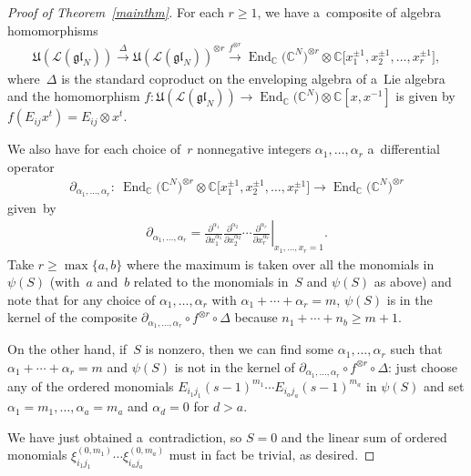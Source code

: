 \documentclass[pdftex]{sigma}
\numberwithin{theorem}{section}
\numberwithin{proposition}{section}
\numberwithin{lemma}{section}
\numberwithin{corollary}{section}
\numberwithin{definition}{section}
\numberwithin{example}{section}
\numberwithin{remark}{section}
\numberwithin{note}{section}
\DeclareMathOperator{\End}{End}
\numberwithin{equation}{section}
\begin{document}
\begin{proof}[Proof of Theorem~\ref{mainthm}]
For each $r \geq 1$, we have a~composite of algebra homomorphisms
\begin{gather*}
\mathfrak{U}(\mathcal{L}(\mathfrak{gl}_N)) \stackrel{\Delta}{\to}
\mathfrak{U}(\mathcal{L}(\mathfrak{gl}_N))^{\otimes r} \stackrel{f^{\otimes r}}{\rightarrow}
\End_{\mathbb{C}}\big(\mathbb{C}^N\big)^{\otimes r} \otimes \mathbb{C}\big[x_1^{\pm 1},x_2^{\pm 1},\ldots,x_r^{\pm 1}\big],
\end{gather*}
where~$\Delta$ is the standard coproduct on the enveloping algebra of a~Lie algebra and the homomorphism $f\colon
\mathfrak{U}(\mathcal{L}(\mathfrak{gl}_N)) \to \End_{\mathbb{C}}\big(\mathbb{C}^N\big) \otimes
\mathbb{C}[x,x^{-1}]$ is given by $f(E_{ij}x^t) = E_{ij} \otimes x^t$.

We also have for each choice of~$r$ nonnegative integers $\alpha_1, \ldots, \alpha_r$ a~dif\/ferential operator
\begin{gather*}
\partial_{\alpha_1,\ldots,\alpha_r}\colon \ \End_{\mathbb{C}}\big(\mathbb{C}^N\big)^{\otimes r} \otimes \mathbb{C}\big[x_1^{\pm
1},x_2^{\pm 1},\ldots,x_r^{\pm 1}\big] \to \End_{\mathbb{C}}\big(\mathbb{C}^N\big)^{\otimes r}
\end{gather*}
given~by
\begin{gather*}
\partial_{\alpha_1, \ldots, \alpha_r}=\left.\frac{\partial^{\alpha_1}}{\partial x_1^{\alpha_1}}
\frac{\partial^{\alpha_2}}{\partial x_2^{\alpha_2}} \cdots \frac{\partial^{\alpha_r}}{\partial x_r^{\alpha_r}}
\right\rvert_{x_1,\ldots,x_r=1}.
\end{gather*}
Take $r \geq \max\{a,b\}$ where the maximum is taken over all the monomials in $\psi(S)$ (with~$a$ and~$b$ related to
the monomials in~$S$ and $\psi(S)$ as above) and note that for any choice of $\alpha_1,\ldots,\alpha_r$ with $\alpha_1+
\cdots + \alpha_r=m$, $\psi(S)$ is in the kernel of the composite $\partial_{\alpha_1,\ldots,\alpha_r} \circ f^{\otimes
r} \circ \Delta$ because $n_1 + \cdots + n_b \geq m+1$.

On the other hand, if~$S$ is nonzero, then we can f\/ind some $\alpha_1,\ldots,\alpha_r$ such that $\alpha_1 + \cdots +
\alpha_r=m$ and $\psi(S)$ is not in the kernel of $\partial_{\alpha_1,\ldots,\alpha_r} \circ f^{\otimes r} \circ
\Delta$: just choose any of the ordered monomials $E_{i_1 j_1}(s-1)^{m_1} \cdots E_{i_a j_a} (s-1)^{m_a}$ in $\psi(S)$
and set $\alpha_1=m_1, \ldots, \alpha_a=m_a$ and $\alpha_d=0$ for $d>a$.

We have just obtained a~contradiction, so $S=0$ and the linear sum of ordered monomials $\xi_{i_1 j_1}^{(0,m_1)} \cdots
\xi_{i_a j_a}^{(0,m_a)}$ must in fact be trivial, as desired.
\end{proof}
\end{document}
